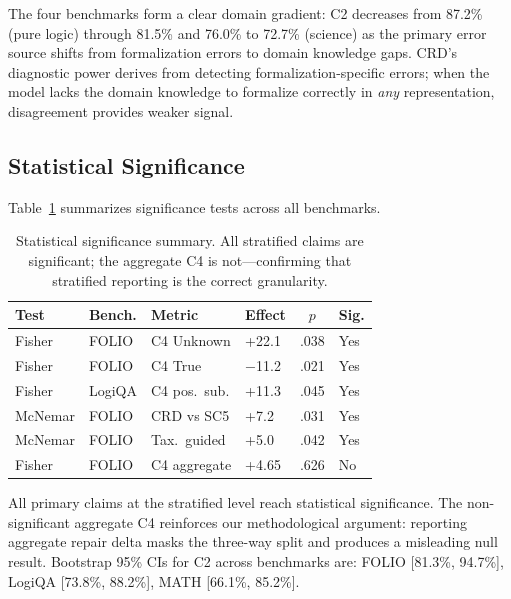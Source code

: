\documentclass[11pt,a4paper]{article}
\newcommand{\pp}{\text{pp}}
\begin{document}
The four benchmarks form a clear domain gradient: C2 decreases from 87.2\% (pure logic) through 81.5\% and 76.0\% to 72.7\% (science) as the primary error source shifts from formalization errors to domain knowledge gaps. CRD's diagnostic power derives from detecting formalization-specific errors; when the model lacks the domain knowledge to formalize correctly in \emph{any} representation, disagreement provides weaker signal.

\subsection{Statistical Significance}
\label{sec:significance}

Table~\ref{tab:significance} summarizes significance tests across all benchmarks.

\begin{table}[t]
\centering
\small
\setlength{\tabcolsep}{3pt}
\begin{tabular}{llllcl}
\toprule
\textbf{Test} & \textbf{Bench.} & \textbf{Metric} & \textbf{Effect} & $p$ & \textbf{Sig.} \\
\midrule
Fisher & FOLIO & C4 Unknown & +22.1\pp{} & .038 & Yes \\
Fisher & FOLIO & C4 True & $-$11.2\pp{} & .021 & Yes \\
Fisher & LogiQA & C4 pos.\ sub. & +11.3\pp{} & .045 & Yes \\
McNemar & FOLIO & CRD vs SC5 & +7.2\pp{} & .031 & Yes \\
McNemar & FOLIO & Tax.\ guided & +5.0\pp{} & .042 & Yes \\
Fisher & FOLIO & C4 aggregate & +4.65\pp{} & .626 & No \\
\bottomrule
\end{tabular}
\caption{Statistical significance summary. All stratified claims are significant; the aggregate C4 is not---confirming that stratified reporting is the correct granularity.}
\label{tab:significance}
\end{table}

All primary claims at the stratified level reach statistical significance. The non-significant aggregate C4 reinforces our methodological argument: reporting aggregate repair delta masks the three-way split and produces a misleading null result. Bootstrap 95\% CIs for C2 across benchmarks are: FOLIO [81.3\%, 94.7\%], LogiQA [73.8\%, 88.2\%], MATH [66.1\%, 85.2\%].
\end{document}
